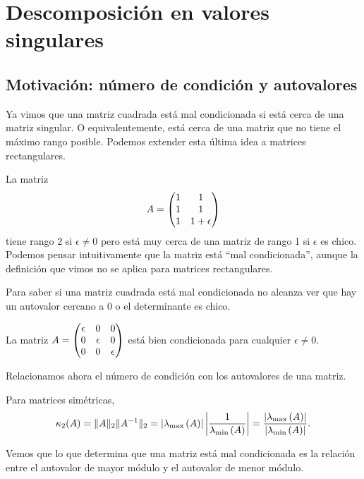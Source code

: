 \chapter{Descomposición en valores singulares}

\section{Motivación: número de condición y autovalores}

Ya vimos que una matriz cuadrada está mal condicionada si está cerca de una matriz singular. O equivalentemente, está cerca de una matriz que no tiene el máximo rango posible. Podemos extender esta última idea a matrices rectangulares.

La matriz
$$
\Ab = \begin{pmatrix}
1 & 1 \\
1 & 1 \\
1 & 1+ \epsilon \end{pmatrix}
$$
tiene rango 2 si $\epsilon \neq 0$ pero está muy cerca de una matriz de rango 1 si $\epsilon$ es chico.
Podemos pensar intuitivamente que la matriz est\'a ``mal condicionada'', aunque la definición que vimos no se aplica para matrices rectangulares.

\begin{observacion} Para saber si una matriz cuadrada está mal condicionada no alcanza ver que hay un autovalor cercano a 0 o el determinante es chico.
\end{observacion}

\begin{ejemplo} La matriz
$
\Ab = \begin{pmatrix}
\epsilon & 0 & 0 \\
0 & \epsilon & 0 \\
0 & 0 & \epsilon
\end{pmatrix}
$
está bien condicionada para cualquier $\epsilon \neq 0$.
\end{ejemplo}


Relacionamos ahora el número de condición con los autovalores de una matriz.

Para matrices simétricas,
$$
\kappa_2(\Ab) = \|\Ab\|_2 \|\Ab^{-1}\|_2 = |\lambda_{\max{}}(\Ab)| \left|\frac{1}{\lambda_{\min{}}(\Ab)}\right| = \frac{|\lambda_{\max{}}(\Ab)|}{|\lambda_{\min{}}(\Ab)|}.
$$

Vemos que lo que determina que una matriz está mal condicionada es la relación entre el autovalor de mayor módulo y el autovalor de menor módulo.




